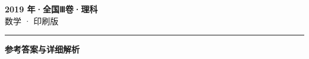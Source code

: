 \documentclass[zihao=5, a4paper]{ctexart}
\begin{document}
\begin{center}
  {\Large\bfseries 2019 年·全国Ⅲ卷·理科}\\[4pt]
  {\large 数学 · 印刷版}
\end{center}
\medskip
{}

\par\bigskip\hrule\bigskip
{}
\begin{center}{\large\bfseries 参考答案与详细解析}\end{center}
\smallskip

\end{document}
